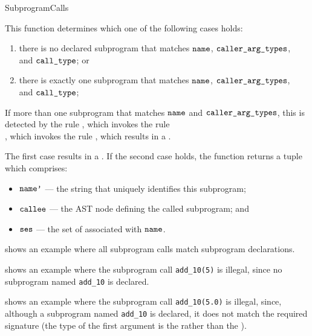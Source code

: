 \begin{TypingRuleList}{SubprogramCalls}


This function determines which one of
the following cases holds:
\begin{enumerate}
\item there is no declared subprogram that matches $\texttt{name}$, $\texttt{caller\_arg\_types}$, \\ and $\texttt{call\_type}$; or
\item there is exactly one subprogram that matches $\texttt{name}$, $\texttt{caller\_arg\_types}$, \\ and $\texttt{call\_type}$;
\end{enumerate}
If more than one subprogram that matches $\texttt{name}$ and
$\texttt{caller\_arg\_types}$, this is detected by the rule
, which invokes the
rule \\ , which invokes
the rule , which results in
a \typingerrorterm{}.

The first case results in a \typingerrorterm{}.
If the second case holds, the function returns a tuple which comprises:
\begin{itemize}
\item $\texttt{name'}$ --- the string that uniquely identifies this subprogram;
\item $\texttt{callee}$ --- the AST node defining the called subprogram; and
\item $\texttt{ses}$ --- the set of \sideeffectdescriptorsterm{} associated with $\texttt{name}$.
\end{itemize}
\ProseOtherwiseTypeError


 shows an example where all subprogram calls
match subprogram declarations.

 shows an example where
the subprogram call \verb|add_10(5)| is illegal, since no subprogram named \verb|add_10|
is declared.

 shows an example where
the subprogram call \verb|add_10(5.0)| is illegal, since, although a subprogram named \verb|add_10|
is declared, it does not match the required signature (the type of the first argument is
the \integertypeterm{} rather than the \realtypeterm).



\end{TypingRuleList}
